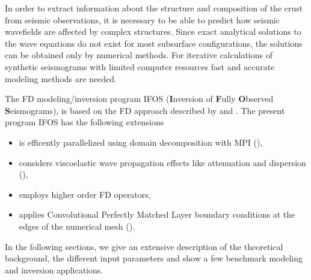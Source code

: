 In order to extract information about the structure and composition of the crust from seismic observations, it is necessary to be able to predict how seismic wavefields are affected by complex structures.
Since exact analytical solutions to the wave equations do not exist for most subsurface configurations, the solutions can be obtained only by numerical methods. For iterative calculations of synthetic seismograms with limited computer resources fast and accurate modeling methods are needed. 

The FD modeling/inversion program IFOS (\textbf{I}nversion of \textbf{F}ully \textbf{O}bserved \textbf{S}eismograms), is based on the FD approach described by \cite{virieux:86} and \cite{levander:88}. The present program IFOS has the following extensions

\begin{itemize}
\item is efficently parallelized using domain decomposition with MPI (\cite{bohlen:02}),
\item considers viscoelastic wave propagation effects like attenuation and dispersion
(\cite{robertsson:94,blanch:95,bohlen:02}),
\item employs higher order FD operators,
\item applies Convolutional Perfectly Matched Layer boundary conditions at the edges of the numerical mesh (\cite{komatitsch:07}).
\end{itemize}

In the following sections, we give an extensive description of the theoretical background, the different input parameters and show a few benchmark modeling and inversion applications.